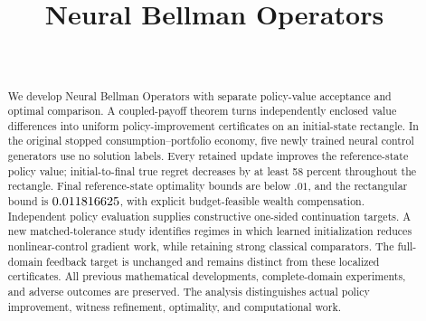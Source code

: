 \documentclass[ecta]{econsocart}
\theoremstyle{remark}
\begin{document}
\begin{frontmatter}
\title{Neural Bellman Operators}
\begin{aug}
\author[id=au1,addressref={add1}]{~}
\address[id=add1]{}
\end{aug}
\begin{abstract}
We develop Neural Bellman Operators with separate policy-value acceptance and optimal comparison. A coupled-payoff theorem turns independently enclosed value differences into uniform policy-improvement certificates on an initial-state rectangle. In the original stopped consumption--portfolio economy, five newly trained neural control generators use no solution labels. Every retained update improves the reference-state policy value; initial-to-final true regret decreases by at least 58 percent throughout the rectangle. Final reference-state optimality bounds are below $.01$, and the rectangular bound is $0.011816625$, with explicit budget-feasible wealth compensation. Independent policy evaluation supplies constructive one-sided continuation targets. A new matched-tolerance study identifies regimes in which learned initialization reduces nonlinear-control gradient work, while retaining strong classical comparators. The full-domain feedback target is unchanged and remains distinct from these localized certificates. All previous mathematical developments, complete-domain experiments, and adverse outcomes are preserved. The analysis distinguishes actual policy improvement, witness refinement, optimality, and computational work.
\end{abstract}
\begin{keyword}
\end{keyword}
\end{frontmatter}

\begin{appendix}




\end{appendix}
\clearpage

\end{document}
